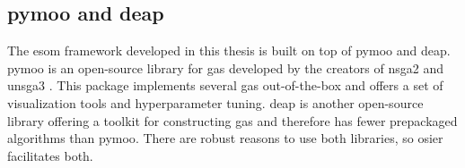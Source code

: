 \subsection{\acs{pymoo} and \acs{deap}}

The \ac{esom} framework developed in this thesis is built on top of \ac{pymoo}
and \ac{deap}. \ac{pymoo} is an open-source library for \acp{ga} developed by
the creators of \ac{nsga2} and \ac{unsga3} \cite{blank_pymoo_2020}. This package
implements several \acp{ga} out-of-the-box and offers a set of visualization
tools and hyperparameter tuning. \ac{deap} is another open-source library
offering a toolkit for constructing \acp{ga} and therefore has fewer prepackaged
algorithms than \ac{pymoo}. There are robust reasons to use both libraries, so
\ac{osier} facilitates both.




